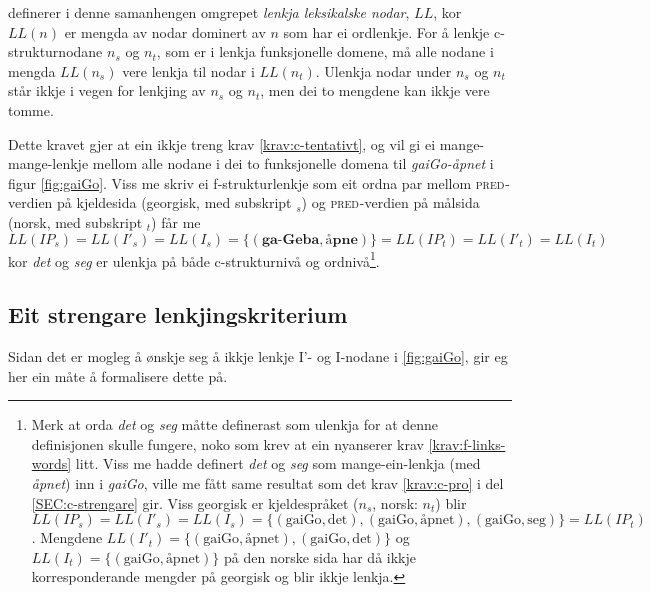 \documentclass[11pt,a4paper,oneside,draft]{book}
\newcommand{\F}[2]{\textsc{#1}\ensuremath{_{#2}}}
\newcommand{\PRED}{\F{pred}{}}
\begin{document}
\citet[s.~77]{dyvik2009lmp} definerer i denne samanhengen
omgrepet \emph{lenkja leksikalske nodar}, $LL$, kor $LL(n)$ er mengda av
nodar dominert av $n$ som har ei ordlenkje. For å lenkje
c-strukturnodane $n_s$ og $n_t$, som er i lenkja funksjonelle domene,
må alle nodane i mengda $LL(n_s)$ vere lenkja til nodar i
$LL(n_t)$. Ulenkja nodar under $n_s$ og $n_t$ står ikkje i vegen for
lenkjing av $n_s$ og $n_t$, men dei to mengdene kan ikkje vere tomme.

Dette kravet gjer at ein ikkje treng krav \ref{krav:c-tentativt}, og
vil gi ei mange-mange-lenkje mellom alle nodane i dei to funksjonelle
domena til \emph{gaiGo-åpnet} i figur \ref{fig:gaiGo}. Viss me skriv ei
f-strukturlenkje som eit ordna par mellom \PRED{}-verdien på kjeldesida
(georgisk, med subskript $_s$) og \PRED{}-verdien på målsida (norsk, med
subskript $_t$) får me
$LL(IP_s)=LL(I'_s)=LL(I_s)=\{(\textbf{ga-Geba},\textbf{åpne})\}=LL(IP_t)=LL(I'_t)=LL(I_t)$
kor \emph{det} og \emph{seg} er ulenkja på både c-strukturnivå og ordnivå\footnote{\label{fn:LL-ordlenkje} Merk at orda \emph{det} og \emph{seg} måtte definerast som ulenkja for
        at denne definisjonen skulle fungere, noko som krev at ein nyanserer
        krav \ref{krav:f-links-words} litt. Viss me hadde definert
        \emph{det} og \emph{seg} som mange-ein-lenkja (med \emph{åpnet}) inn i
        \emph{gaiGo}, ville me fått same resultat som det krav
        \ref{krav:c-pro} i del \ref{SEC:c-strengare} gir.
        Viss georgisk er kjeldespråket
        ($n_s$, norsk: $n_t$) blir
        $LL(IP_s)=LL(I'_s)=LL(I_s)=\{(\text{gaiGo},\text{det}),(\text{gaiGo},\text{åpnet}),(\text{gaiGo},\text{seg})\}=LL(IP_t)$.
        Mengdene
        $LL(I'_t)=\{(\text{gaiGo},\text{åpnet}),(\text{gaiGo},\text{det})\}$
        og $LL(I_t)=\{(\text{gaiGo},\text{åpnet})\}$ på den norske
        sida har då ikkje korresponderande mengder på georgisk og blir
        ikkje lenkja. }.


\subsection{Eit strengare lenkjingskriterium}
\label{sec-3.7.2}

\label{SEC:c-strengare}

Sidan det er mogleg å ønskje seg å ikkje lenkje I'- og I-nodane i
\ref{fig:gaiGo}, gir eg her ein måte å formalisere dette på.
\end{document}
